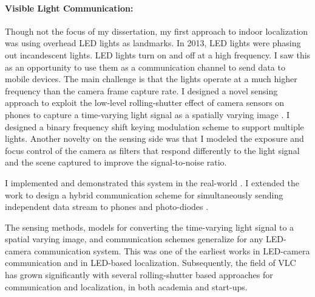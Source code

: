 \documentclass[10pt]{article}
\begin{document}
\paragraph{Visible Light Communication: }

Though not the focus of my dissertation, my first approach to indoor localization was using overhead LED lights as landmarks. In 2013, LED lights were phasing out incandescent lights. 
LED lights turn on and off at a high frequency. I saw this as an opportunity to use them as a communication channel to send data to mobile devices. The main challenge is that the lights operate at a much higher frequency than the camera frame capture rate. %
I designed a novel sensing approach to exploit the low-level rolling-shutter effect of camera sensors on phones to capture a time-varying light signal as a spatially varying image \cite{rajagopal2014visual, rajagopal2014demonstration}. %
I designed a binary frequency shift keying modulation scheme to support multiple lights.  
Another novelty on the sensing side was that I modeled the exposure and focus control of the camera as
filters that respond differently to the light signal and the scene
captured to improve the signal-to-noise ratio.

I implemented and demonstrated this system in the real-world \cite{rajagopal2014demonstration}. I extended the work to design a hybrid communication scheme %
for simultaneously sending independent data stream to phones and photo-diodes \cite{rajagopal2014hybrid}. 

The sensing methods, models for converting the time-varying light signal to a spatial varying image, and communication schemes generalize for any LED-camera communication system. This was one of the earliest works in LED-camera communication and in LED-based localization. Subsequently, the field of VLC has grown significantly with several rolling-shutter based
approaches for communication and localization, in both academia and
start-ups.
\end{document}
